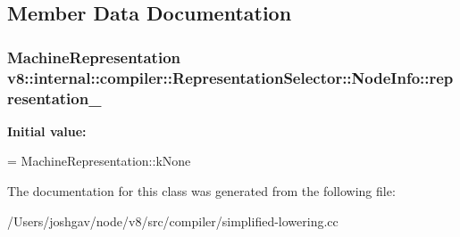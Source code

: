 \subsection{Member Data Documentation}
\subsubsection[{\texorpdfstring{representation\+\_\+}{representation_}}]{\setlength{\rightskip}{0pt plus 5cm}Machine\+Representation v8\+::internal\+::compiler\+::\+Representation\+Selector\+::\+Node\+Info\+::representation\+\_\+\hspace{0.3cm}{\ttfamily [private]}}\hypertarget{classv8_1_1internal_1_1compiler_1_1_representation_selector_1_1_node_info_aa536c837307269e1af1b7c98174d0958}{}\label{classv8_1_1internal_1_1compiler_1_1_representation_selector_1_1_node_info_aa536c837307269e1af1b7c98174d0958}
{\bfseries Initial value\+:}
\begin{DoxyCode}
=
        MachineRepresentation::kNone
\end{DoxyCode}


The documentation for this class was generated from the following file\+:\begin{DoxyCompactItemize}
\item 
/\+Users/joshgav/node/v8/src/compiler/simplified-\/lowering.\+cc\end{DoxyCompactItemize}
